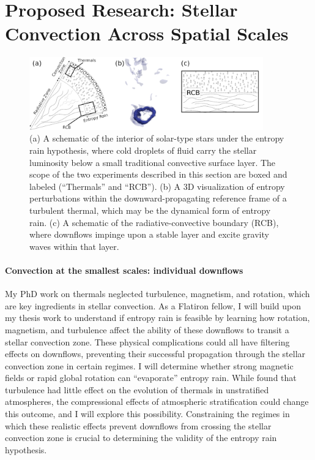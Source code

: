 \documentclass[onecolumn, hmargin=1in, vmargin=1in]{aastex62}
\begin{document}
\section*{\textbf{Proposed Research: Stellar Convection Across Spatial Scales}} 
\begin{figure}[t]
	\begin{center}
    \includegraphics[width=0.9\textwidth]{./figs/tri_panel.png}
	\end{center}
    \caption{ (a) A schematic of the interior of solar-type stars under the entropy rain hypothesis, where cold droplets of fluid carry the stellar luminosity below a small traditional convective surface layer.
	The scope of the two experiments described in this section are boxed and labeled (``Thermals'' and ``RCB'').
	(b) A 3D visualization of entropy perturbations within the downward-propagating reference frame of a turbulent thermal, which may be the dynamical form of entropy rain.
	(c) A schematic of the radiative-convective boundary (RCB), where downflows impinge upon a stable layer and excite gravity waves within that layer.
	\label{fig:tri_panel} }
	\vspace{-11pt}
\end{figure}

\paragraph{Convection at the smallest scales: individual downflows} 
My PhD work on thermals \citep[][described above]{andersLB2019} neglected turbulence, magnetism, and rotation, which are key ingredients in stellar convection.
As a Flatiron fellow, I will build upon my thesis work to understand if entropy rain is feasible by learning how rotation, magnetism, and turbulence affect the ability of these downflows to transit a stellar convection zone.
These physical complications could all have filtering effects on downflows, preventing their successful propagation through the stellar convection zone in certain regimes.
I will determine whether strong magnetic fields or rapid global rotation can ``evaporate'' entropy rain.
While \citet{lecoanet&jeevanjee2019} found that turbulence had little effect on the evolution of thermals in unstratified atmospheres, the compressional effects of atmospheric stratification could change this outcome, and I will explore this possibility.
Constraining the regimes in which these realistic effects prevent downflows from crossing the stellar convection zone is crucial to determining the validity of the entropy rain hypothesis.
\end{document}
